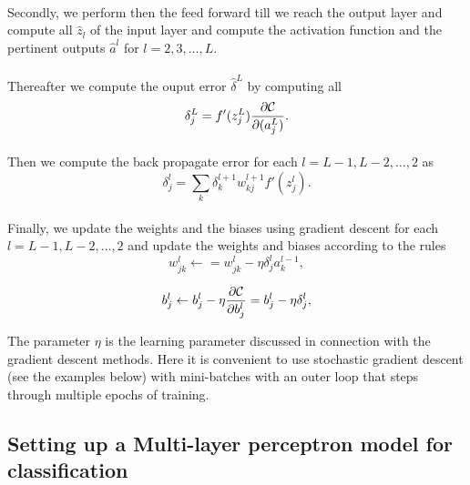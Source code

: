 \documentclass[%
oneside,                 %
final,                   %
10pt]{article}
\begin{document}
\paragraph{}
Secondly, we perform then the feed forward till we reach the output
layer and compute all $\hat{z}_l$ of the input layer and compute the
activation function and the pertinent outputs $\hat{a}^l$ for
$l=2,3,\dots,L$.




\paragraph{}
Thereafter we compute the ouput error $\hat{\delta}^L$ by computing all
\[
\delta_j^L = f'(z_j^L)\frac{\partial {\cal C}}{\partial (a_j^L)}.
\]




\paragraph{}
Then we compute the back propagate error for each $l=L-1,L-2,\dots,2$ as
\[
\delta_j^l = \sum_k \delta_k^{l+1}w_{kj}^{l+1}f'(z_j^l).
\]




\paragraph{}
Finally, we update the weights and the biases using gradient descent for each $l=L-1,L-2,\dots,2$ and update the weights and biases according to the rules
\[
w_{jk}^l\leftarrow  = w_{jk}^l- \eta \delta_j^la_k^{l-1},
\]

\[
b_j^l \leftarrow b_j^l-\eta \frac{\partial {\cal C}}{\partial b_j^l}=b_j^l-\eta \delta_j^l,
\]



The parameter $\eta$ is the learning parameter discussed in connection with the gradient descent methods.
Here it is convenient to use stochastic gradient descent (see the examples below) with mini-batches with an outer loop that steps through multiple epochs of training.


\subsection*{Setting up a Multi-layer perceptron model for classification}
\end{document}
